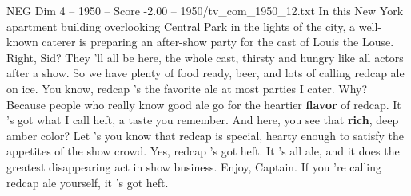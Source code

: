 \begin{textsample}{NEG Dim 4 – 1950 – Score -2.00 – 1950/tv\_com\_1950\_12.txt}  \label{ex:f4_neg_019}
In this New York apartment building overlooking Central Park in the lights of the city, a well-known caterer is preparing an after-show party for the cast of Louis the Louse.
Right, Sid?
They 'll all be here, the whole cast, thirsty and hungry like all actors after a show.
So we have plenty of food ready, beer, and lots of calling redcap ale on ice.
You know, redcap 's the favorite ale at most parties I cater.
Why?
Because people who really know good ale go for the heartier \textbf{flavor} of redcap.
It 's got what I call heft, a taste you remember.
And here, you see that \textbf{rich}, deep amber color?
Let 's you know that redcap is special, hearty enough to satisfy the appetites of the show crowd.
Yes, redcap 's got heft.
It 's all ale, and it does the greatest disappearing act in show business.
Enjoy, Captain.
If you 're calling redcap ale yourself, it 's got heft.

\end{textsample}
